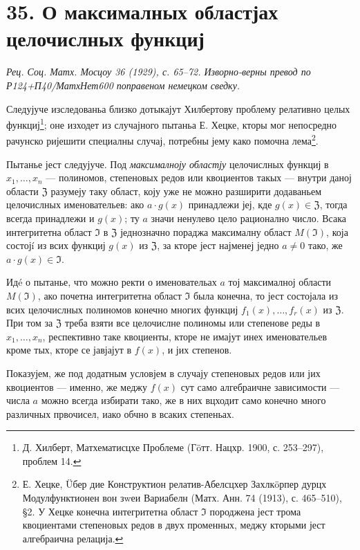 \documentclass[11pt]{article}
\begin{document}
\section*{35. О максималных областјах целочислных функциј}
\emph{Рец. Соц. Матх. Мосцоу 36 (1929), с. 65--72. Изворно-верны превод по Р124+П40/МатхНет600 поправеном немецком сведку.}

Следујуче изследованьа близко дотыкајут Хилбертову проблему релативно целых функциј\footnote{Д. Хилберт, Матхематисцхе Проблеме (Гöтт. Нацхр. 1900, с. 253--297), проблем 14.}; оне изходет из случајного пытаньа Е. Хецке, кторы мог непосредно рачунско ријешити специалны случај, потребны јему како помочна лема\footnote{Е. Хецке, Üбер дие Конструктион релатив-Абелсцхер Захлкöрпер дурцх Модулфунктионен вон зwеи Вариабелн (Матх. Анн. 74 (1913), с. 465--510), §2. У Хецке конечна интегритетна област \(\mathfrak{I}\) породжена јест трома квоциентами степеновых редов в двух променных, меджу кторыми јест алгебраична релација.}.

Пытанье јест следујуче. Под \textit{максималноју областју} целочислных функциј в \(x_1,\ldots,x_n\) --- полиномов, степеновых редов или квоциентов такых --- внутри даној области \(\mathfrak{Z}\) разумеју таку област, коју уже не можно разширити додаваньем целочислных именовательев: ако \(a\cdot g(x)\) принадлежи јеј, кде \(g(x)\in\mathfrak{Z}\), тогда всегда принадлежи и \(g(x)\); ту \(a\) значи ненулево цело рационално число. Всака интегритетна област \(\mathfrak{I}\) в \(\mathfrak{Z}\) једнозначно пораджа максималну област \(M(\mathfrak{I})\), која состојí из всих функциј \(g(x)\) из \(\mathfrak{Z}\), за кторе јест најменеј једно \(a\ne0\) тако, же \(a\cdot g(x)\in\mathfrak{I}\).

Идé о пытанье, что можно ректи о именовательах \(a\) тој максималној области \(M(\mathfrak{I})\), ако почетна интегритетна област \(\mathfrak{I}\) была конечна, то јест состојала из всих целочислных полиномов конечно многих функциј \(f_1(x),\ldots,f_r(x)\) из \(\mathfrak{Z}\). При том за \(\mathfrak{Z}\) треба взяти все целочислне полиномы или степенове реды в \(x_1,\ldots,x_n\), респективно таке квоциенты, кторе не имајут инех именовательев кроме тых, кторе се јавјајут в \(f(x)\), и јих степенов.

Показујем, же под додатным условјем в случају степеновых редов или јих квоциентов --- именно, же меджу \(f(x)\) сут само алгебраичне зависимости --- числа \(a\) можно всегда избирати тако, же в них вцходит само конечно много различных првочисел, иако обчно в всаких степеньах.
\end{document}
